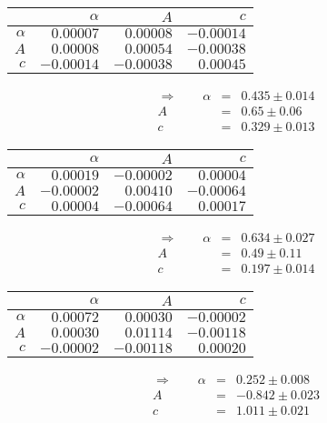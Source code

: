  \begin{tabular}{|r|r|r|r|}
 \hline 
\cellcolor{tabcolor}&\cellcolor{tabcolor}$\alpha$&\cellcolor{tabcolor}$A$&\cellcolor{tabcolor}$c$\\ \hline 
 \cellcolor{tabcolor}$\alpha$&$0.00007$ &$0.00008$ &$-0.00014$ \\ \hline
\cellcolor{tabcolor}$A$&$0.00008$ &$0.00054$ &$-0.00038$ \\ \hline
\cellcolor{tabcolor}$c$&$-0.00014$ &$-0.00038$ &$0.00045$ \\ \hline
\end{tabular}
\begin{align}\Rightarrow \qquad
    \alpha &=& 0.435 \pm 0.014 \\
    A &=& 0.65 \pm 0.06 \\
    c &=& 0.329 \pm 0.013 
\end{align}

 \begin{tabular}{|r|r|r|r|}
 \hline 
\cellcolor{tabcolor}&\cellcolor{tabcolor}$\alpha$&\cellcolor{tabcolor}$A$&\cellcolor{tabcolor}$c$\\ \hline 
 \cellcolor{tabcolor}$\alpha$&$0.00019$ &$-0.00002$ &$0.00004$ \\ \hline
\cellcolor{tabcolor}$A$&$-0.00002$ &$0.00410$ &$-0.00064$ \\ \hline
\cellcolor{tabcolor}$c$&$0.00004$ &$-0.00064$ &$0.00017$ \\ \hline
\end{tabular}
\begin{align}\Rightarrow \qquad
    \alpha &=& 0.634 \pm 0.027 \\
    A &=& 0.49 \pm 0.11 \\
    c &=& 0.197 \pm 0.014 
\end{align}

 \begin{tabular}{|r|r|r|r|}
 \hline 
\cellcolor{tabcolor}&\cellcolor{tabcolor}$\alpha$&\cellcolor{tabcolor}$A$&\cellcolor{tabcolor}$c$\\ \hline 
 \cellcolor{tabcolor}$\alpha$&$0.00072$ &$0.00030$ &$-0.00002$ \\ \hline
\cellcolor{tabcolor}$A$&$0.00030$ &$0.01114$ &$-0.00118$ \\ \hline
\cellcolor{tabcolor}$c$&$-0.00002$ &$-0.00118$ &$0.00020$ \\ \hline
\end{tabular}
\begin{align}\Rightarrow \qquad
    \alpha &=& 0.252 \pm 0.008 \\
    A &=& -0.842 \pm 0.023 \\
    c &=& 1.011 \pm 0.021 
\end{align}

